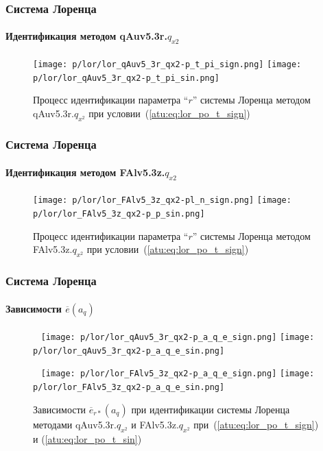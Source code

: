 \documentclass[10pt,utf8]{beamer}
\begin{document}

\begin{frame}
  \frametitle{Система Лоренца}
  \framesubtitle{Идентификация методом qAuv5.3r.$q_{x2}$}


  \begin{figure}[h!]
    \centerline{
      \texttt{[image: p/lor/lor\_qAuv5\_3r\_qx2-p\_t\_pi\_sign.png]}
      \hfill
      \texttt{[image: p/lor/lor\_qAuv5\_3r\_qx2-p\_t\_pi\_sin.png]}
    }
    \caption{Процесс идентификации параметра ``$r$'' системы Лоренца методом qAuv5.3r.$q_{x^2}$ при условии~(\ref{atu:eq:lor_po_t_sign})}
    \label{atu:f:lor_id_qAuv5.3r.q_x2_sign}
  \end{figure}

\end{frame}




\begin{frame}
  \frametitle{Система Лоренца}
  \framesubtitle{Идентификация методом FAlv5.3z.$q_{x2}$}


  \begin{figure}[h!]
    \centerline{
      \texttt{[image: p/lor/lor\_FAlv5\_3z\_qx2-pl\_n\_sign.png]}
      \hfill
      \texttt{[image: p/lor/lor\_FAlv5\_3z\_qx2-p\_p\_sin.png]}
    }
    \caption{Процесс идентификации параметра ``$r$'' системы Лоренца методом FAlv5.3z.$q_{x^2}$ при условии~(\ref{atu:eq:lor_po_t_sign})}
    \label{atu:f:lor_id_FAlv5.3z.q_x2_sign}
  \end{figure}


\end{frame}




\begin{frame}
  \frametitle{Система Лоренца}
  \framesubtitle{Зависимости $\overline{e}(a_q)$}

  \begin{figure}[h!]
    \centerline{
      {~}\hfill
      \texttt{[image: p/lor/lor\_qAuv5\_3r\_qx2-p\_a\_q\_e\_sign.png]}
      \hfill
      \texttt{[image: p/lor/lor\_qAuv5\_3r\_qx2-p\_a\_q\_e\_sin.png]}
      \hfill{~}
    }
    \centerline{
      {~}\hfill
      \texttt{[image: p/lor/lor\_FAlv5\_3z\_qx2-p\_a\_q\_e\_sign.png]}
      \hfill
      \texttt{[image: p/lor/lor\_FAlv5\_3z\_qx2-p\_a\_q\_e\_sin.png]}
      \hfill{~}
    }
    \caption{Зависимости $\overline{e}_{r*}(a_q)$ при идентификации системы Лоренца методами qAuv5.3r.$q_{x^2}$ и FAlv5.3z.$q_{x^2}$
     при~(\ref{atu:eq:lor_po_t_sign}) и (\ref{atu:eq:lor_po_t_sin})}
    \label{atu:f:lor_a_q_Fq.q_x2}
  \end{figure}


\end{frame}
\end{document}
